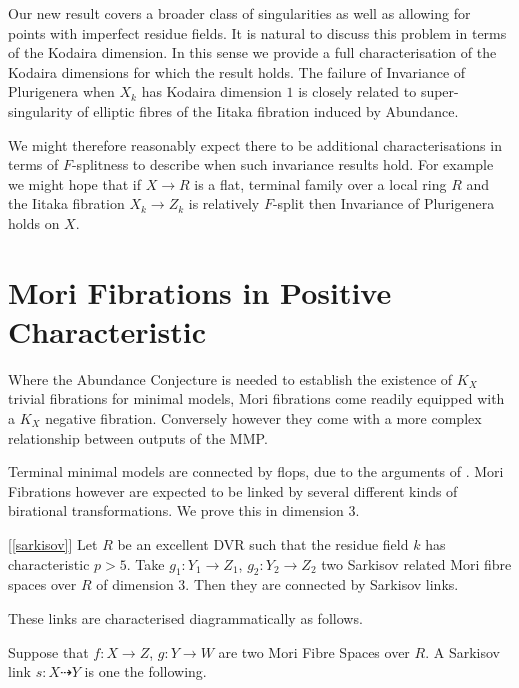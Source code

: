 \documentclass[a4paper,12pt]{book}
\begin{document}
	Our new result covers a broader class of singularities as well as allowing for points with imperfect residue fields. It is natural to discuss this problem in terms of the Kodaira dimension. In this sense we provide a full characterisation of the Kodaira dimensions for which the result holds. The failure of Invariance of Plurigenera when $X_{k}$ has Kodaira dimension $1$ is closely related to super-singularity of elliptic fibres of the Iitaka fibration induced by Abundance. 
	
	We might therefore reasonably expect there to be additional characterisations in terms of $F$-splitness to describe when such invariance results hold. For example we might hope that if $X \to R$ is a flat, terminal family over a local ring $R$ and the Iitaka fibration $X_{k}\to Z_{k}$ is relatively $F$-split then Invariance of Plurigenera holds on $X$.
	
	
	\section{Mori Fibrations in Positive Characteristic}
	
	Where the Abundance Conjecture is needed to establish the existence of $K_{X}$ trivial fibrations for minimal models, Mori fibrations come readily equipped with a $K_{X}$ negative fibration. Conversely however they come with a more complex relationship between outputs of the MMP. 
	
	Terminal minimal models are connected by flops, due to the arguments of \cite{}. Mori Fibrations however are expected to be linked by several different kinds of birational transformations. We prove this in dimension $3$.
	
	\begin{theo}\label{Main_Finite1}[\autoref{sarkisov}]
		Let $R$ be an excellent DVR such that the residue field $k$ has characteristic $p>5$. Take $g_{1}:Y_{1} \to Z_{1}$, $g_{2}:Y_{2} \to Z_{2}$ two Sarkisov related Mori fibre spaces over $R$ of dimension $3$. Then they are connected by Sarkisov links.
	\end{theo}
	
	These links are characterised diagrammatically as follows.
	
	Suppose that $f:X \to Z$, $g:Y \to W$ are two Mori Fibre Spaces over $R$. A Sarkisov link $s:X \dashrightarrow Y$ is one the following.
	
\end{document}
